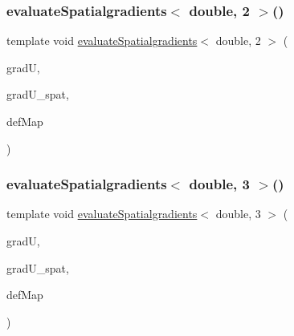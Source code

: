 \mbox{\label{function_evaluations_8cc_a3f479e2f2e28603def984ea4c2e02ad9}} 
\subsubsection{\texorpdfstring{evaluate\+Spatialgradients$<$ double, 2 $>$()}{evaluateSpatialgradients< double, 2 >()}\hspace{0.1cm}{\footnotesize\ttfamily [2/2]}}
{\footnotesize\ttfamily template void \mbox{\hyperlink{group___evaluation_functions_ga0b976342d491f6215953e2e65ea6a0de}{evaluate\+Spatialgradients}}$<$ double, 2 $>$ (\begin{DoxyParamCaption}\item[{Table$<$ 3, double $>$ \&}]{gradU,  }\item[{Table$<$ 3, double $>$}]{grad\+U\+\_\+spat,  }\item[{\mbox{\hyperlink{structdeformation_map}{deformation\+Map}}$<$ double, 2 $>$ \&}]{def\+Map }\end{DoxyParamCaption})}

\mbox{\label{function_evaluations_8cc_ac4df16de901d5280657a240a274e62a2}} 
\subsubsection{\texorpdfstring{evaluate\+Spatialgradients$<$ double, 3 $>$()}{evaluateSpatialgradients< double, 3 >()}\hspace{0.1cm}{\footnotesize\ttfamily [1/2]}}
{\footnotesize\ttfamily template void \mbox{\hyperlink{group___evaluation_functions_ga0b976342d491f6215953e2e65ea6a0de}{evaluate\+Spatialgradients}}$<$ double, 3 $>$ (\begin{DoxyParamCaption}\item[{Table$<$ 2, double $>$ \&}]{gradU,  }\item[{Table$<$ 2, double $>$}]{grad\+U\+\_\+spat,  }\item[{\mbox{\hyperlink{structdeformation_map}{deformation\+Map}}$<$ double, 3 $>$ \&}]{def\+Map }\end{DoxyParamCaption})}


